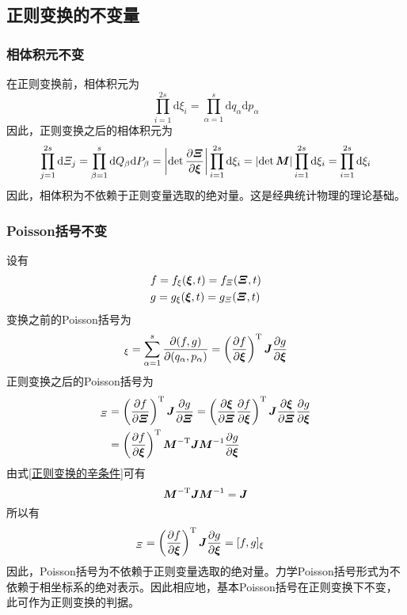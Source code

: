 \subsection{正则变换的不变量}

\subsubsection{相体积元不变}

在正则变换前，相体积元为
\begin{equation*}
	\prod_{i=1}^{2s} \mathrm{d} \xi_i = \prod_{\alpha=1}^s \mathrm{d} q_\alpha \mathrm{d} p_\alpha
\end{equation*}
因此，正则变换之后的相体积元为
\begin{equation*}
	\prod_{j=1}^{2s} \mathrm{d} \mathnormal{\Xi}_j = \prod_{\beta=1}^s \mathrm{d} Q_\beta \mathrm{d} P_\beta = \left|\det\frac{\partial \boldsymbol{\mathnormal{\Xi}}}{\partial \boldsymbol{\xi}}\right| \prod_{i=1}^{2s} \mathrm{d} \xi_i = \left|\det \boldsymbol{M}\right| \prod_{i=1}^{2s} \mathrm{d} \xi_i = \prod_{i=1}^{2s} \mathrm{d} \xi_i
\end{equation*}
因此，相体积为不依赖于正则变量选取的绝对量。这是经典统计物理的理论基础。

\subsubsection{Poisson括号不变}

设有
\begin{align*}
	& f = f_\xi(\boldsymbol{\xi},t) = f_{\mathnormal{\Xi}}(\boldsymbol{\mathnormal{\Xi}},t) \\
	& g = g_\xi(\boldsymbol{\xi},t) = g_{\mathnormal{\Xi}}(\boldsymbol{\mathnormal{\Xi}},t)
\end{align*}
变换之前的Poisson括号为
\begin{equation*}
	[f,g]_\xi = \sum_{\alpha=1}^s \frac{\pl (f,g)}{\pl (q_\alpha,p_\alpha)} = \left(\frac{\pl f}{\pl \mbf{\xi}}\right)^{\mathrm{T}} \mbf{J} \frac{\pl g}{\pl \mbf{\xi}}
\end{equation*}
正则变换之后的Poisson括号为
\begin{align*}
	[f,g]_{\mathnormal{\Xi}} & = \left(\frac{\pl f}{\pl \mrm{\Xi}}\right)^{\mathrm{T}} \mbf{J} \frac{\pl g}{\pl \mrm{\Xi}} = \left(\frac{\pl \mbf{\xi}}{\pl \mrm{\Xi}} \frac{\pl f}{\pl \mbf{\xi}} \right)^{\mathrm{T}} \mbf{J} \frac{\pl \mbf{\xi}}{\pl \mrm{\Xi}}  \frac{\pl g}{\pl \mbf{\xi}} \\
	& = \left(\frac{\pl f}{\pl \mbf{\xi}}\right)^{\mathrm{T}} \mbf{M}^{-\mathrm{T}} \mbf{J} \mbf{M}^{-1} \frac{\pl g}{\pl \mbf{\xi}}
\end{align*}
由式\eqref{正则变换的辛条件}可有
\begin{equation*}
	\boldsymbol{M}^{-\mathrm{T}} \boldsymbol{J} \boldsymbol{M}^{-1} = \boldsymbol{J}
\end{equation*}
所以有
\begin{align*}
	[f,g]_{\mathnormal{\Xi}} & = \left(\frac{\pl f}{\pl \mbf{\xi}}\right)^{\mathrm{T}} \mbf{J} \frac{\pl g}{\pl \mbf{\xi}} = [f,g]_\xi
\end{align*}
因此，Poisson括号为不依赖于正则变量选取的绝对量。力学Poisson括号形式为不依赖于相坐标系的绝对表示。因此相应地，基本Poisson括号在正则变换下不变，此可作为正则变换的判据。

